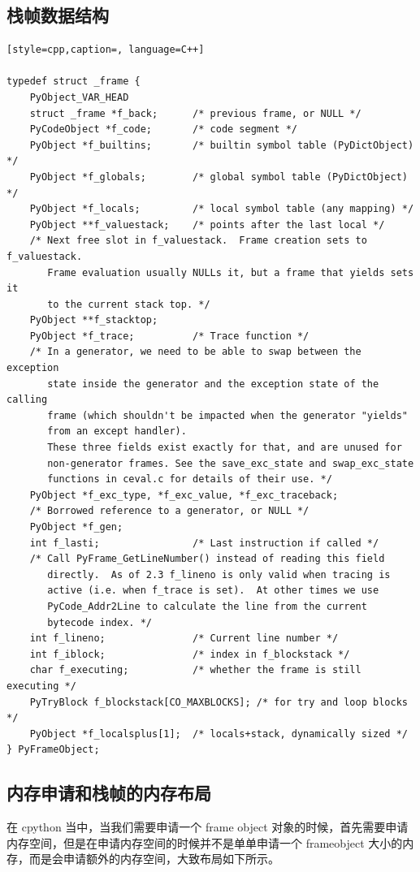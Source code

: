 \subsection{栈帧数据结构}
\begin{lstlisting}[style=cpp,caption=, language=C++]

typedef struct _frame {
    PyObject_VAR_HEAD
    struct _frame *f_back;      /* previous frame, or NULL */
    PyCodeObject *f_code;       /* code segment */
    PyObject *f_builtins;       /* builtin symbol table (PyDictObject) */
    PyObject *f_globals;        /* global symbol table (PyDictObject) */
    PyObject *f_locals;         /* local symbol table (any mapping) */
    PyObject **f_valuestack;    /* points after the last local */
    /* Next free slot in f_valuestack.  Frame creation sets to f_valuestack.
       Frame evaluation usually NULLs it, but a frame that yields sets it
       to the current stack top. */
    PyObject **f_stacktop;
    PyObject *f_trace;          /* Trace function */
    /* In a generator, we need to be able to swap between the exception
       state inside the generator and the exception state of the calling
       frame (which shouldn't be impacted when the generator "yields"
       from an except handler).
       These three fields exist exactly for that, and are unused for
       non-generator frames. See the save_exc_state and swap_exc_state
       functions in ceval.c for details of their use. */
    PyObject *f_exc_type, *f_exc_value, *f_exc_traceback;
    /* Borrowed reference to a generator, or NULL */
    PyObject *f_gen;
    int f_lasti;                /* Last instruction if called */
    /* Call PyFrame_GetLineNumber() instead of reading this field
       directly.  As of 2.3 f_lineno is only valid when tracing is
       active (i.e. when f_trace is set).  At other times we use
       PyCode_Addr2Line to calculate the line from the current
       bytecode index. */
    int f_lineno;               /* Current line number */
    int f_iblock;               /* index in f_blockstack */
    char f_executing;           /* whether the frame is still executing */
    PyTryBlock f_blockstack[CO_MAXBLOCKS]; /* for try and loop blocks */
    PyObject *f_localsplus[1];  /* locals+stack, dynamically sized */
} PyFrameObject;
\end{lstlisting}
\subsection{内存申请和栈帧的内存布局}
在 cpython 当中，当我们需要申请一个 frame object 对象的时候，首先需要申请内存空间，但是在申请内存空间的时候并不是单单申请一个 frameobject 大小的内存，而是会申请额外的内存空间，大致布局如下所示。

